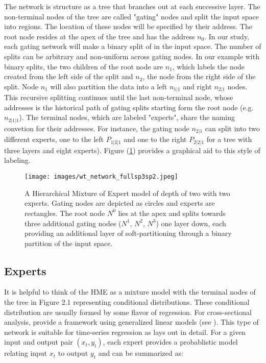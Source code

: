 \documentclass[12pt]{article}
\begin{document}
The network is structure as a tree that branches out at each successive
layer. The non-terminal nodes of the tree are called "gating" nodes and
split the input space into regions. The location of these nodes will be
specified by their address. The root node resides at the apex of the tree
and has the address $n_{0}$. In our study, each gating network will make
a binary split of in the input space. The number of splits can be
arbitrary and non-uniform across gating nodes. In our example with binary
splits, the two children of the root node are $n_{1}$, which labels the
node created from the left side of the split and $n_{2}$, the node from
the right side of the split. Node $n_{1}$ will also partition the data
into a left $n_{1|1}$ and right $n_{2|1}$ nodes. This recursive splitting
continues until the last non-terminal node, whose addresses is the
historical path of gating splits starting form the root node (e.g. $n_{2|1|1}$).
The terminal nodes, which are labeled "experts", share the naming
convetion for their addresses. For instance, the gating node $n_{2|1}$
can split into two different experts, one to the left $P_{1|2|1}$ and one
to the right $P_{2|2|1}$ for a tree with three layers and eight experts).
Figure (\ref{fig:HMEexample}) provides a graphical aid to this style of
labeling.

\begin{figure}[ht]
  \centering
  \texttt{[image: images/wt\_network\_fullsp3sp2.jpeg]}
  \caption{A Hierarchical Mixture of Expert model of depth of two with two
  experts. Gating nodes are depicted as circles and experts are rectangles.
  The root node $N^{0}$ lies at the apex and splits towards three additional
  gating nodes ($N^{1}$, $N^{2}$, $N^{3}$) one layer down, each providing an
  additional layer of soft-partitioning through a binary partition of the input
  space.}
  \label{fig:HMEexample}
\end{figure}



\subsection{Experts}
It is helpful to think of the HME as a mixture model with the terminal
nodes of the tree in Figure 2.1 representing conditional distributions.
These conditional distribution are usually formed by some flavor of
regression. For cross-sectional analysis, \cite{JordanJacobs1993} provide
a framework using generalized linear models (see \cite{GLM1972}). This type
of network is suitable for time-series regression as \cite{HuertaJiangTanner2003}
lays out in detail. For a given input and output pair $(x_{t}, y_{t})$,
each expert provides a probablistic model relating input $x_{t}$ to output
$y_{t}$ and can be summarized as:
\end{document}
